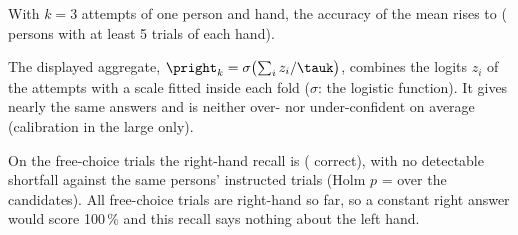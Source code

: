 With $k = 3$ attempts of one person and hand, the accuracy of the mean \pright{} rises to 
( persons with at least 5 trials of each hand).

The displayed aggregate, $\pright_k = \sigma\bigl(\sum_i z_i/\tauk\bigr)$, combines the logits $z_i$ of the
attempts with a scale \tauk{} fitted inside each fold ($\sigma$: the logistic function). It gives nearly the same
answers and is neither over- nor under-confident on average (calibration in the large only).

On the  free-choice trials the right-hand recall is 
( correct), with no detectable shortfall against the same persons' instructed trials (Holm
$p$ =  over the  candidates). All free-choice trials are right-hand so
far, so a constant right answer would score 100\,\% and this recall says nothing about the left hand.
